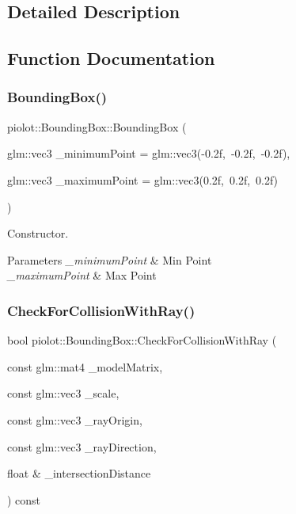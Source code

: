\subsection{Detailed Description}


\subsection{Function Documentation}
\mbox{\label{group___getters_ga699e27e8e646be7a0a47f89abb35778d}} 
\subsubsection{\texorpdfstring{Bounding\+Box()}{BoundingBox()}}
{\footnotesize\ttfamily piolot\+::\+Bounding\+Box\+::\+Bounding\+Box (\begin{DoxyParamCaption}\item[{glm\+::vec3}]{\+\_\+minimum\+Point = {\ttfamily glm\+:\+:vec3(-\/0.2f,~-\/0.2f,~-\/0.2f)},  }\item[{glm\+::vec3}]{\+\_\+maximum\+Point = {\ttfamily glm\+:\+:vec3(0.2f,~0.2f,~0.2f)} }\end{DoxyParamCaption})\hspace{0.3cm}{\ttfamily [explicit]}}



Constructor. 


\begin{DoxyParams}{Parameters}
{\em \+\_\+minimum\+Point} & Min Point \\
\hline
{\em \+\_\+maximum\+Point} & Max Point \\
\hline
\end{DoxyParams}
\mbox{\label{group___getters_ga552fcdb461cdc71c5da0fed7b486246d}} 
\subsubsection{\texorpdfstring{Check\+For\+Collision\+With\+Ray()}{CheckForCollisionWithRay()}}
{\footnotesize\ttfamily bool piolot\+::\+Bounding\+Box\+::\+Check\+For\+Collision\+With\+Ray (\begin{DoxyParamCaption}\item[{const glm\+::mat4}]{\+\_\+model\+Matrix,  }\item[{const glm\+::vec3}]{\+\_\+scale,  }\item[{const glm\+::vec3}]{\+\_\+ray\+Origin,  }\item[{const glm\+::vec3}]{\+\_\+ray\+Direction,  }\item[{float \&}]{\+\_\+intersection\+Distance }\end{DoxyParamCaption}) const}



